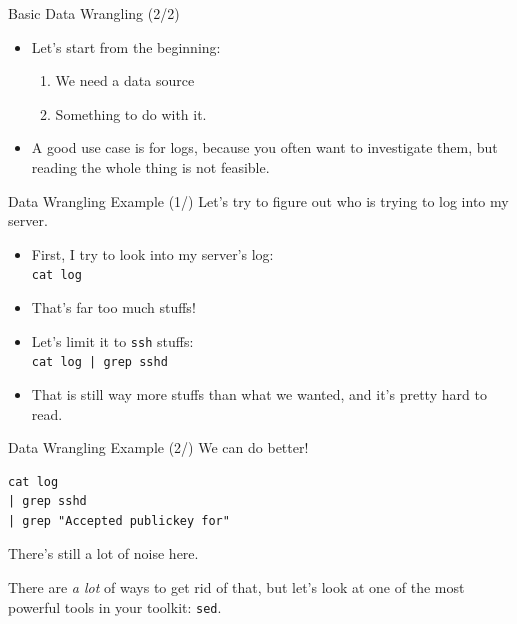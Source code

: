 \documentclass[12pt]{beamer}
\begin{document}
\begin{frame}{Basic Data Wrangling (2/2)}
  \begin{itemize}
    \item Let's start from the beginning:
          \begin{enumerate}
            \item We need a data source
            \item Something to do with it.
          \end{enumerate}
    \item A good use case is for logs, because you often want to investigate them, but reading the whole thing is not feasible.
  \end{itemize}
\end{frame}

\begin{frame}[fragile]{Data Wrangling Example (1/)}
  Let's try to figure out who is trying to log into my server.
  \begin{itemize}
    \item First, I try to look into my server's log: \\\texttt{cat log}
    \item That's far too much stuffs!
    \item Let's limit it to \texttt{ssh} stuffs: \\\texttt{cat log | grep sshd}
    \item That is still way more stuffs than what we wanted, and it's pretty hard to read.
  \end{itemize}
\end{frame}

\begin{frame}[fragile]{Data Wrangling Example (2/)}
  We can do better!
  \begin{verbatim}
cat log
| grep sshd
| grep "Accepted publickey for"
  \end{verbatim}
  There's still a lot of noise here.

  There are \emph{a lot} of ways to get rid of that, but let’s look at one of the most powerful tools in your toolkit: \texttt{sed}.
\end{frame}
\end{document}

